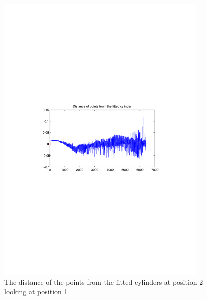 \begin{figure}[htbp]
    \centering
    \includegraphics[width=0.9\textwidth]{pics/pos2-irregular-tof-dist}
    \caption{The distance of the points from the fitted cylinders at position 2 looking at
    position 1}
    \label{chap7:fig-pos2-irregular-tof-dits}
\end{figure}
